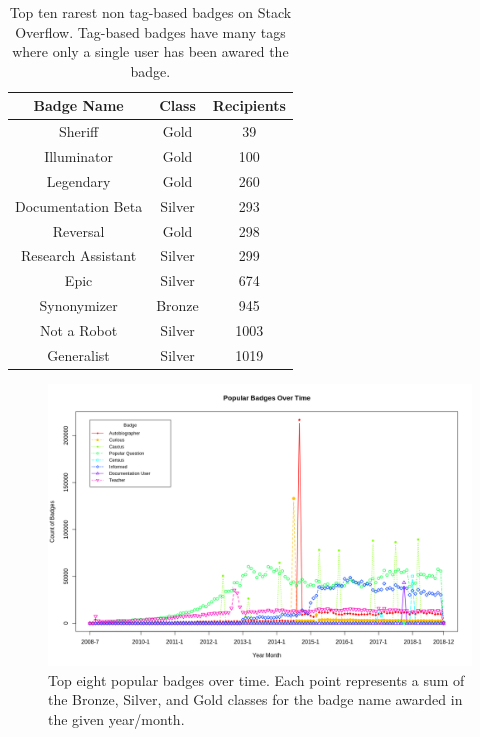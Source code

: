 \documentclass[a4paper,11pt, notitlepage]{report}
\theoremstyle{definition}
\numberwithin{equation}{section}		%
\begin{document}
\begin{table}[ht]
    \centering
    \begin{tabular}{c|cc}
    \hline
    \textbf{Badge Name} & \textbf{Class} & \textbf{Recipients} \\ \hline
    Sheriff & Gold & 39 \\
    Illuminator & Gold & 100 \\
    Legendary & Gold & 260 \\
    Documentation Beta & Silver & 293 \\
    Reversal & Gold & 298 \\
    Research Assistant & Silver & 299 \\
    Epic & Silver & 674 \\
    Synonymizer & Bronze & 945 \\
    Not a Robot & Silver & 1003 \\
    Generalist & Silver & 1019 \\
    \end{tabular}
    \caption{Top ten rarest non tag-based badges on Stack Overflow. Tag-based badges have many tags where only a single user has been awared the badge.}
    \label{tab:rarest-badges}
\end{table}

\begin{figure}[ht]
    \centering
    \includegraphics[angle=270,width=5.5in]{figures/popular_badges_over_time.png}
    \caption{Top eight popular badges over time. Each point represents a sum of the Bronze, Silver, and Gold classes for the badge name awarded in the given year/month.}
    \label{fig:popular-badges-over-time}
\end{figure}
\end{document}
